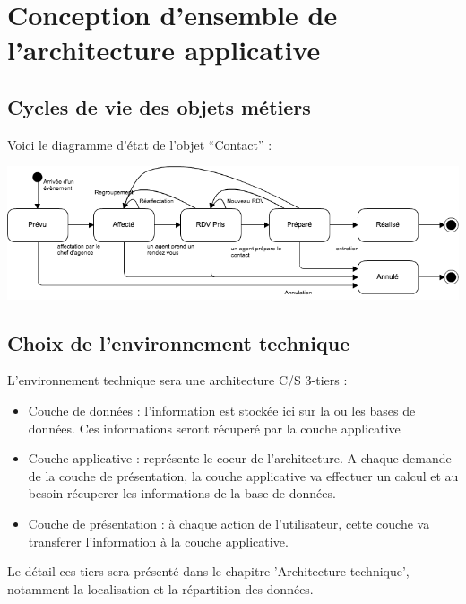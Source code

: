 

\section{Conception d'ensemble de l'architecture applicative}


\subsection{Cycles de vie des objets métiers}

Voici le diagramme d'état de l'objet ``Contact'' :

\begin {center}
\includegraphics[width=\textwidth]{diagramme-etat-objet-contact.png}
\end {center}

\subsection{Choix de l'environnement technique}
L'environnement technique sera une architecture C/S 3-tiers :
\begin{itemize}
\item Couche de données : l'information est stockée ici sur la ou les bases de données. Ces informations seront récuperé par la couche applicative
\item Couche applicative : représente le coeur de l'architecture. A chaque demande de la couche de présentation, la couche applicative va effectuer un calcul et au besoin récuperer les informations de la base de données.
\item Couche de présentation : à chaque action de l'utilisateur, cette couche va transferer l'information à la couche applicative.
\end{itemize}
Le détail ces tiers sera présenté dans le chapitre 'Architecture technique', notamment la localisation et la répartition des données.